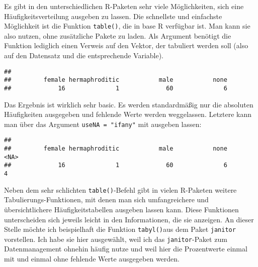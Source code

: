 \documentclass[
]{book}
\newenvironment{Shaded}{\begin{snugshade}}{\end{snugshade}}
\newcommand{\AttributeTok}[1]{\textcolor[rgb]{0.77,0.63,0.00}{#1}}
\newcommand{\CommentTok}[1]{\textcolor[rgb]{0.56,0.35,0.01}{\textit{#1}}}
\newcommand{\FunctionTok}[1]{\textcolor[rgb]{0.00,0.00,0.00}{#1}}
\newcommand{\NormalTok}[1]{#1}
\newcommand{\SpecialCharTok}[1]{\textcolor[rgb]{0.00,0.00,0.00}{#1}}
\newcommand{\StringTok}[1]{\textcolor[rgb]{0.31,0.60,0.02}{#1}}
\begin{document}
Es gibt in den unterschiedlichen R-Paketen sehr viele Möglichkeiten, sich eine Häufigkeitsverteilung ausgeben zu lassen. Die schnellste und einfachste Möglichkeit ist die Funktion \texttt{table()}, die in base R verfügbar ist. Man kann sie also nutzen, ohne zusätzliche Pakete zu laden. Als Argument benötigt die Funktion lediglich einen Verweis auf den Vektor, der tabuliert werden soll (also auf den Datensatz und die entsprechende Variable).

\begin{Shaded}
\end{Shaded}

\begin{verbatim}
## 
##         female hermaphroditic           male           none 
##             16              1             60              6
\end{verbatim}

Das Ergebnis ist wirklich sehr basic. Es werden standardmäßig nur die absoluten Häufigkeiten ausgegeben und fehlende Werte werden weggelassen. Letztere kann man über das Argument \texttt{useNA\ =\ "ifany"} mit ausgeben lassen:

\begin{Shaded}
\end{Shaded}

\begin{verbatim}
## 
##         female hermaphroditic           male           none           <NA> 
##             16              1             60              6              4
\end{verbatim}

Neben dem sehr schlichten \texttt{table()}-Befehl gibt in vielen R-Paketen weitere Tabulierungs-Funktionen, mit denen man sich umfangreichere und übersichtlichere Häufigkeitstabellen ausgeben lassen kann. Diese Funktionen unterscheiden sich jeweils leicht in den Informationen, die sie anzeigen. An dieser Stelle möchte ich beispielhaft die Funktion \texttt{tabyl()}aus dem Paket \texttt{janitor} vorstellen. Ich habe sie hier ausgewählt, weil ich das \texttt{janitor}-Paket zum Datenmanagement ohnehin häufig nutze und weil hier die Prozentwerte einmal mit und einmal ohne fehlende Werte ausgegeben werden.
\end{document}
